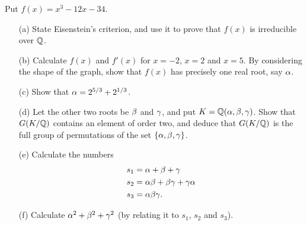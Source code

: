 \documentclass[a4paper]{article}
\begin{document}
\begin{problem}%
 Put $f(x)=x^3-12x-34$.
 \begin{itemize}
  \item[(a)] State Eisenstein's criterion, and use it to prove that
   $f(x)$ is irreducible over ${\mathbb{Q}}$. 
  \item[(b)] Calculate $f(x)$ and $f'(x)$ for $x=-2$, $x=2$ and $x=5$.
   By considering the shape of the graph, show that $f(x)$ has
   precisely one real root, say $\alpha$.  
  \item[(c)] Show that $\alpha=2^{5/3}+2^{1/3}$. 
  \item[(d)] Let the other two roots be $\beta$ and $\gamma$, and put
   $K={\mathbb{Q}}(\alpha,\beta,\gamma)$.  Show that $G(K/{\mathbb{Q}})$ contains an element of
   order two, and deduce that $G(K/{\mathbb{Q}})$ is the full group of
   permutations of the set $\{\alpha,\beta,\gamma\}$. 
  \item[(e)] Calculate the numbers
   \begin{align*}
    s_1 &= \alpha+\beta+\gamma \\
    s_2 &= \alpha\beta+\beta\gamma+\gamma\alpha \\
    s_3 &= \alpha\beta\gamma.
   \end{align*}
  \item[(f)] Calculate $\alpha^2+\beta^2+\gamma^2$ (by relating it to $s_1$,
   $s_2$ and $s_3$). 
 \end{itemize}
\end{problem}
\end{document}
